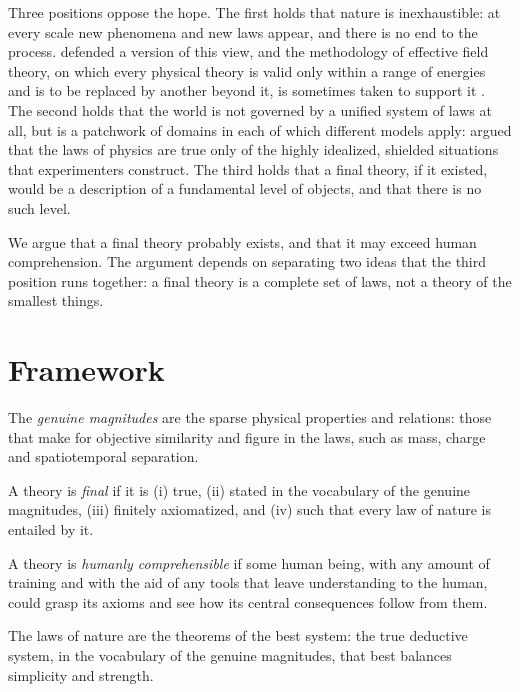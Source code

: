 \documentclass{situationist-preprint}
\begin{document}
Three positions oppose the hope. The first holds that nature is inexhaustible: at every scale new phenomena and new laws appear, and there is no end to the process. \citet{Dyson1988} defended a version of this view, and the methodology of effective field theory, on which every physical theory is valid only within a range of energies and is to be replaced by another beyond it, is sometimes taken to support it \citep{Weinberg1979}. The second holds that the world is not governed by a unified system of laws at all, but is a patchwork of domains in each of which different models apply: \citet{Cartwright1999} argued that the laws of physics are true only of the highly idealized, shielded situations that experimenters construct. The third holds that a final theory, if it existed, would be a description of a fundamental level of objects, and that there is no such level.

We argue that a final theory probably exists, and that it may exceed human comprehension. The argument depends on separating two ideas that the third position runs together: a final theory is a complete set of laws, not a theory of the smallest things.

\section{Framework}

\begin{definition}\label{d:genuine}
The \emph{genuine magnitudes} are the sparse physical properties and relations: those that make for objective similarity and figure in the laws, such as mass, charge and spatiotemporal separation.
\end{definition}

\begin{definition}\label{d:final}
A theory is \emph{final} if it is (i) true, (ii) stated in the vocabulary of the genuine magnitudes, (iii) finitely axiomatized, and (iv) such that every law of nature is entailed by it.
\end{definition}

\begin{definition}\label{d:comprehensible}
A theory is \emph{humanly comprehensible} if some human being, with any amount of training and with the aid of any tools that leave understanding to the human, could grasp its axioms and see how its central consequences follow from them.
\end{definition}

\begin{assumption}\label{a:humean}
The laws of nature are the theorems of the best system: the true deductive system, in the vocabulary of the genuine magnitudes, that best balances simplicity and strength.
\end{assumption}
\end{document}
